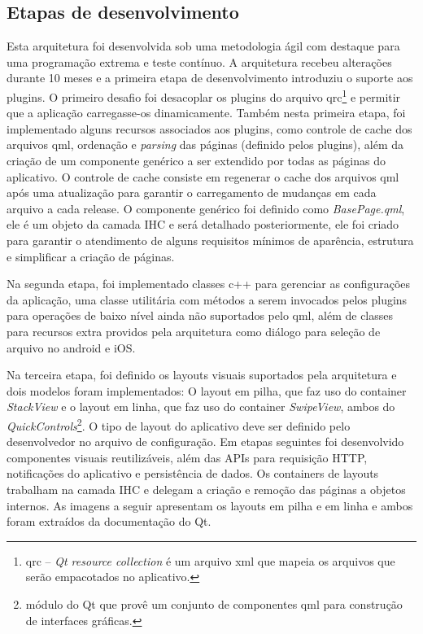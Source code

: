 \subsection{Etapas de desenvolvimento}
Esta arquitetura foi desenvolvida sob uma metodologia ágil com destaque para uma programação extrema e teste contínuo. A arquitetura recebeu alterações durante 10 meses e a primeira etapa de desenvolvimento introduziu o suporte aos plugins. O primeiro desafio foi desacoplar os plugins do arquivo qrc\footnote{qrc – \textit{Qt resource collection} é um arquivo xml que mapeia os arquivos que serão empacotados no aplicativo.} e permitir que a aplicação carregasse-os dinamicamente. Também nesta primeira etapa, foi implementado alguns recursos associados aos plugins, como controle de cache dos arquivos qml, ordenação e \textit{parsing} das páginas (definido pelos plugins), além da criação de um componente genérico a ser extendido por todas as páginas do aplicativo. O controle de cache consiste em regenerar o cache dos arquivos qml após uma atualização para garantir o carregamento de mudanças em cada arquivo a cada release. O componente genérico foi definido como \textit{BasePage.qml}, ele é um objeto da camada IHC e será detalhado posteriormente, ele foi criado para garantir o atendimento de alguns requisitos mínimos de aparência, estrutura e simplificar a criação de páginas.\par

Na segunda etapa, foi implementado classes c++ para gerenciar as configurações da aplicação, uma classe utilitária com métodos a serem invocados pelos plugins para operações de baixo nível ainda não suportados pelo qml, além de classes para recursos extra providos pela arquitetura como diálogo para seleção de arquivo no android e iOS.\par

Na terceira etapa, foi definido os layouts visuais suportados pela arquitetura e dois modelos foram implementados: O layout em pilha, que faz uso do container \textit{StackView} e o layout em linha, que faz uso do container \textit{SwipeView}, ambos do \textit{QuickControls}\footnote{módulo do Qt que provê um conjunto de componentes qml para construção de interfaces gráficas.}. O tipo de layout do aplicativo deve ser definido pelo desenvolvedor no arquivo de configuração. Em etapas seguintes foi desenvolvido componentes visuais reutilizáveis, além das APIs para requisição HTTP, notificações do aplicativo e persistência de dados. Os containers de layouts trabalham na camada IHC e delegam a criação e remoção das páginas a objetos internos. As imagens a seguir apresentam os layouts em pilha e em linha e ambos foram extraídos da documentação do Qt.

